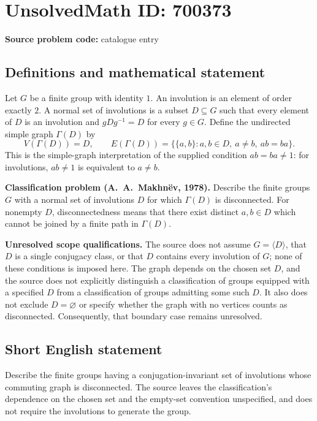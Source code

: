 \documentclass[11pt]{article}
\begin{document}
\section*{UnsolvedMath ID: 700373}
\textbf{Source problem code:} catalogue entry
\subsection{Definitions and mathematical statement}
Let \(G\) be a finite group with identity \(1\). An involution is an element of order exactly \(2\). A normal set of involutions is a subset \(D\subseteq G\) such that every element of \(D\) is an involution and \(gDg^{-1}=D\) for every \(g\in G\). Define the undirected simple graph \(\Gamma(D)\) by
\[
V(\Gamma(D))=D,\qquad E(\Gamma(D))=\bigl\{\{a,b\}:a,b\in D,\ a\ne b,\ ab=ba\bigr\}.
\]
This is the simple-graph interpretation of the supplied condition \(ab=ba\ne 1\): for involutions, \(ab\ne 1\) is equivalent to \(a\ne b\).

\textbf{Classification problem (A.\ A.\ Makhn\"ev, 1978).} Describe the finite groups \(G\) with a normal set of involutions \(D\) for which \(\Gamma(D)\) is disconnected. For nonempty \(D\), disconnectedness means that there exist distinct \(a,b\in D\) which cannot be joined by a finite path in \(\Gamma(D)\).

\textbf{Unresolved scope qualifications.} The source does not assume \(G=\langle D\rangle\), that \(D\) is a single conjugacy class, or that \(D\) contains every involution of \(G\); none of these conditions is imposed here. The graph depends on the chosen set \(D\), and the source does not explicitly distinguish a classification of groups equipped with a specified \(D\) from a classification of groups admitting some such \(D\). It also does not exclude \(D=\varnothing\) or specify whether the graph with no vertices counts as disconnected. Consequently, that boundary case remains unresolved.
\subsection{Short English statement}
Describe the finite groups having a conjugation-invariant set of involutions whose commuting graph is disconnected. The source leaves the classification's dependence on the chosen set and the empty-set convention unspecified, and does not require the involutions to generate the group.
\end{document}
